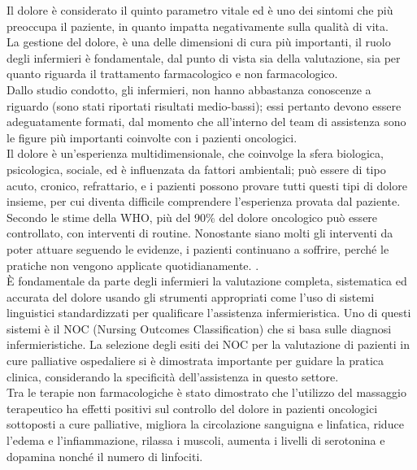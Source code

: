 Il dolore è considerato il quinto parametro vitale ed è uno dei sintomi che più preoccupa il paziente, 
in quanto impatta negativamente sulla qualità di vita.\\ La gestione del dolore, 
è una delle dimensioni di cura più importanti, il ruolo degli infermieri è fondamentale, 
dal punto di vista sia della valutazione, sia per quanto riguarda il trattamento farmacologico e non farmacologico.\\ 
Dallo studio condotto, gli infermieri, non hanno abbastanza conoscenze a riguardo (sono stati riportati risultati 
medio-bassi); essi pertanto devono essere adeguatamente formati, dal momento che all’interno del team di 
assistenza sono le figure più importanti coinvolte con i pazienti oncologici\cite{PAIN}.\\
Il dolore è un’esperienza multidimensionale, che coinvolge la sfera biologica, psicologica, sociale, ed è 
influenzata da fattori ambientali; può essere di tipo acuto, cronico, refrattario, e i pazienti possono 
provare tutti questi tipi di dolore insieme, per cui diventa difficile comprendere l’esperienza provata dal 
paziente.\\ Secondo le stime  della WHO, più del 90\% del dolore oncologico può essere controllato, 
con interventi di routine. Nonostante siano molti gli interventi da poter attuare seguendo le evidenze, 
i pazienti continuano a soffrire, perché le pratiche non vengono applicate quotidianamente.
\cite{PAINONS}.\\
È fondamentale da parte degli infermieri la valutazione completa, sistematica ed accurata del dolore usando 
gli strumenti appropriati come l'uso di sistemi linguistici standardizzati per qualificare l’assistenza infermieristica. 
Uno di questi sistemi è il NOC (Nursing Outcomes Classification) che si basa sulle diagnosi infermieristiche. 
La selezione degli esiti dei NOC per la valutazione di pazienti in cure palliative ospedaliere si è dimostrata 
importante per guidare la pratica clinica, considerando la specificità dell’assistenza in questo settore\cite{painNOC}.\\
Tra le terapie non farmacologiche è stato dimostrato che l’utilizzo del massaggio terapeutico ha effetti positivi sul 
controllo del dolore in pazienti oncologici sottoposti a cure palliative, migliora la circolazione sanguigna e linfatica, 
riduce l’edema e l’infiammazione, rilassa i muscoli, aumenta i livelli di 
serotonina e dopamina nonché il numero di linfociti\cite{tpnonfarmacologiche}.\\

